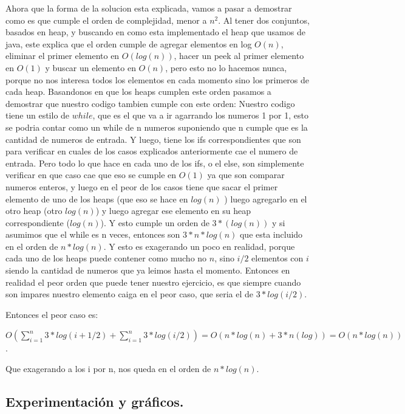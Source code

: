 \vspace*{0.3cm}

Ahora que la forma de la solucion esta explicada, vamos a pasar a demostrar como es que cumple el orden de complejidad, menor a $n^2$.
Al tener dos conjuntos, basados en heap, y buscando en como esta implementado el heap que usamos de java, este explica que el orden cumple de 
agregar elementos en log $O(n)$, eliminar el primer elemento en $O(log(n))$, hacer un peek al primer elemento en $O(1)$ y buscar un elemento en $O(n)$,
pero esto no lo  hacemos nunca, porque no nos interesa todos los elementos en cada momento sino los primeros de cada heap.
\newline
Basandonos en que los heaps cumplen este orden pasamos a demostrar que nuestro codigo tambien cumple con este orden:
Nuestro codigo tiene un estilo de $while$, que es el que va a ir agarrando los numeros 1 por 1, esto se podria contar como un while de n numeros
suponiendo que n cumple que es la cantidad de numeros de entrada. Y luego, tiene los ifs correspondientes que son para verificar en cuales de
los casos explicados anteriormente cae el numero de entrada. Pero todo lo que hace en cada uno de los ifs, o el else, son simplemente verificar
en que caso cae que eso se cumple en $O(1)$ ya que son comparar numeros enteros, y luego en el peor de los casos tiene que sacar el primer elemento
de uno de los heaps (que eso se hace en $log (n)$ ) luego agregarlo en el otro heap (otro $log(n)$) y luego agregar ese elemento en su heap 
correspondiente ($log(n)$). Y esto cumple un orden de $3*(log(n))$ y si asumimos que el while es n veces, entonces son $3*n*log(n)$ que esta incluido
en el orden de $n*log(n)$. Y esto es exagerando un poco en realidad, porque cada uno de los heaps puede contener como mucho no $n$, sino $i/2$ elementos
con $i$ siendo la cantidad de numeros que ya leimos hasta el momento. Entonces en realidad el peor orden que puede tener nuestro ejercicio, 
es que siempre cuando son impares nuestro elemento caiga en el peor caso, que seria el de $3*log(i/2)$.



Entonces el peor caso es:

$ O(\sum_{i=1}^{n}3*log(i+1/2) + \sum_{i=1}^{n}3*log(i/2))= O(n*log(n)+3*n(log)) = O(n*log(n))$.

Que exagerando a los i por n, nos queda en el orden de $n*log(n)$.



\newpage
\subsection{Experimentación y gráficos.}

